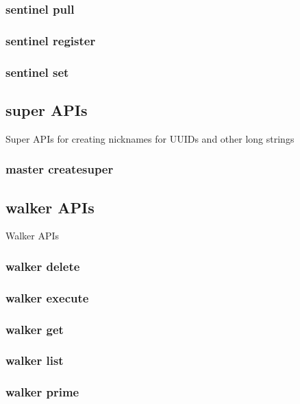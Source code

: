 \subsubsection{sentinel pull}

\subsubsection{sentinel register}

\subsubsection{sentinel set}

\subsection{super APIs}

Super APIs for creating nicknames for UUIDs and other long strings
\par
    

\subsubsection{master createsuper}

\subsection{walker APIs}

Walker APIs

\subsubsection{walker delete}

\subsubsection{walker execute}

\subsubsection{walker get}

\subsubsection{walker list}

\subsubsection{walker prime}

